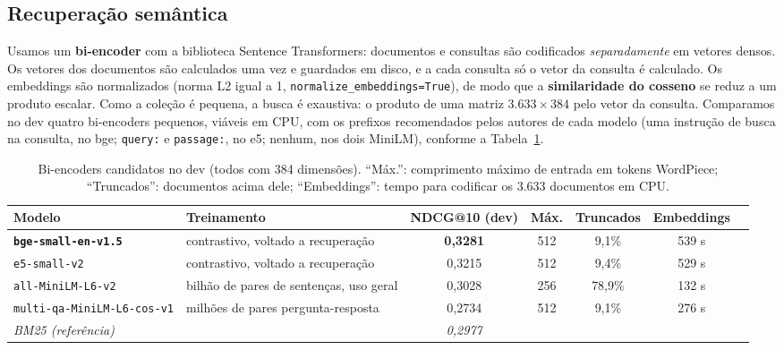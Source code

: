 \documentclass[10pt,a4paper]{article}
\begin{document}
\subsection{Recuperação semântica}

Usamos um \textbf{bi-encoder} com a biblioteca Sentence Transformers: documentos e consultas são codificados \emph{separadamente} em vetores densos. Os vetores dos documentos são calculados uma vez e guardados em disco, e a cada consulta só o vetor da consulta é calculado. Os embeddings são normalizados (norma L2 igual a 1, \texttt{normalize\_embeddings=True}), de modo que a \textbf{similaridade do cosseno} se reduz a um produto escalar. Como a coleção é pequena, a busca é exaustiva: o produto de uma matriz $3.633 \times 384$ pelo vetor da consulta. Comparamos no dev quatro bi-encoders pequenos, viáveis em CPU, com os prefixos recomendados pelos autores de cada modelo (uma instrução de busca na consulta, no bge; \texttt{query:} e \texttt{passage:}, no e5; nenhum, nos dois MiniLM), conforme a Tabela~\ref{tab:biencoders}.

\begin{table}[!htb]
\centering\small
\caption{Bi-encoders candidatos no dev (todos com 384 dimensões). ``Máx.'': comprimento máximo de entrada em tokens WordPiece; ``Truncados'': documentos acima dele; ``Embeddings'': tempo para codificar os 3.633 documentos em CPU.}
\label{tab:biencoders}
\begin{tabularx}{\linewidth}{@{}l>{\raggedright\arraybackslash}Xccccr@{}}
\toprule
Modelo & Treinamento & NDCG@10 (dev) & Máx. & Truncados & Embeddings \\
\midrule
\textbf{\texttt{bge-small-en-v1.5}} & contrastivo, voltado a recuperação & \textbf{0,3281} & 512 & 9,1\% & 539 s \\
\texttt{e5-small-v2} & contrastivo, voltado a recuperação & 0,3215 & 512 & 9,4\% & 529 s \\
\texttt{all-MiniLM-L6-v2} & 1 bilhão de pares de sentenças, uso geral & 0,3028 & 256 & 78,9\% & 132 s \\
\texttt{multi-qa-MiniLM-L6-cos-v1} & 215 milhões de pares pergunta-resposta & 0,2734 & 512 & 9,1\% & 276 s \\
\midrule
\emph{BM25 (referência)} & & \emph{0,2977} & & & \\
\bottomrule
\end{tabularx}
\end{table}
\end{document}
